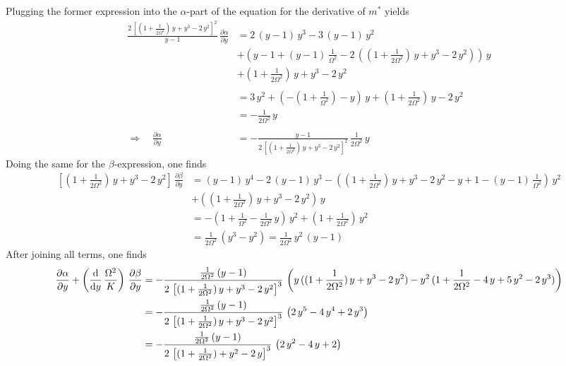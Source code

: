     Plugging the former expression into the $\alpha$-part of the equation for the derivative of $m^*$ yields
    \begin{align*}
        \frac{2\,\left[(1+\frac{1}{2\Omega^2})\,{y}+{y}^3-2\,{y}^2\right]^2}{{y}-1}\,\frac{\partial \alpha}{\partial{y}}&=2\,({y}-1)\,{y}^3-3\,({y}-1)\,{y}^2\\
        &+\left( {y}-1+({y}-1)\,\frac{1}{\Omega^2}-2\,\left((1+\frac{1}{2\Omega^2})\,{y}+{y}^3-2\,{y}^2\right) \right)\,{y}\\
        &+(1+\frac{1}{2\Omega^2})\,{y}+{y}^3-2\,{y}^2 \\\\
        &=3\,{y}^2+\left( -(1+\frac{1}{\Omega^2})-{y}\right)\,{y}+(1+\frac{1}{2\Omega^2})\,{y}-2\,{y}^2\\
        &=-\frac{1}{2\Omega^2}\,{y}\\\\
        \Rightarrow\quad\frac{\partial \alpha}{\partial{y}}&=-\frac{{y}-1}{2\,\left[(1+\frac{1}{2\Omega^2})\,{y}+{y}^3-2\,{y}^2\right]^2}\,\frac{1}{2\Omega^2}\,{y}
    \end{align*}
    Doing the same for the $\beta$-expression, one finds
    \begin{align*}
        \left[(1+\frac{1}{2\Omega^2})\,{y}+{y}^3-2\,{y}^2\right]\,\frac{\partial \beta}{\partial{y}}&=({y}-1)\,{y}^4-2\,({y}-1)\,{y}^3-\left( (1+\frac{1}{2\Omega^2})\,{y}+{y}^3-2\,{y}^2-{y}+1-({y}-1)\,\frac{1}{\Omega^2} \right)\,{y}^2\\
        &+((1+\frac{1}{2\Omega^2})\,{y}+{y}^3-2\,{y}^2)\,{y}\\
        &=-\left( 1+\frac{1}{\Omega^2}-\frac{1}{2\Omega^2}\,{y}  \right)\,{y}^2+(1+\frac{1}{2\Omega^2})\,{y}^2\\
        &=\frac{1}{2\Omega^2}\,({y}^3-{y}^2)=\frac{1}{2\Omega^2}\,{y}^2\,({y}-1)
    \end{align*}
    After joining all terms, one finds
    \begin{align*}
        \frac{\partial \alpha}{\partial{y}}+\left(\frac{\text{d}}{\text{d}{y}}\,\frac{\Omega^2}{K}\right)\,\frac{\partial \beta}{\partial{y}}&=-\frac{\frac{1}{2\Omega^2}\,({y}-1)}{2\,\left[(1+\frac{1}{2\Omega^2})\,{y}+{y}^3-2\,{y}^2\right]^3}\,\left( {y}\,((1+\frac{1}{2\Omega^2})\,{y}+{y}^3-2\,{y}^2) -{y}^2\,(1+\frac{1}{2\Omega^2}-4\,{y}+5\,{y}^2-2\,{y}^3)\right)\\
        &=-\frac{\frac{1}{2\Omega^2}\,({y}-1)}{2\,\left[(1+\frac{1}{2\Omega^2})\,{y}+{y}^3-2\,{y}^2\right]^3}\,\left( 2\,{y}^5-4\,{y}^4+2\,{y}^3 \right)\\
        &=-\frac{\frac{1}{2\Omega^2}\,({y}-1)}{2\,\left[(1+\frac{1}{2\Omega^2})+{y}^2-2\,{y}\right]^3}\,\left( 2\,{y}^2-4\,{y}+2 \right)
    \end{align*}
